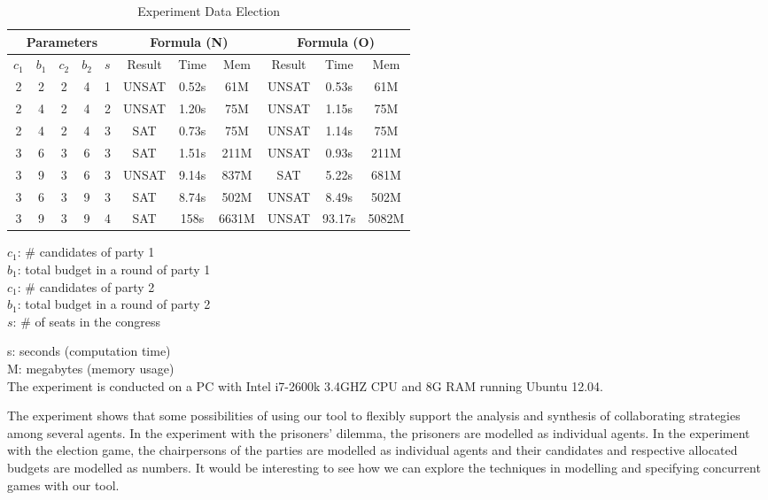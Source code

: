 \begin{table*}[!th]
\caption{Experiment Data Election}
\label{tab.exp.vote}
\begin{center}
\begin{tabular}{c|c|c|c|c||c|c|c||c|c|c} \hline
\multicolumn{5}{c||}{Parameters}
&\multicolumn{3}{c||}{Formula (N)} 
& \multicolumn{3}{c}{Formula (O)}\\ \hline
$c_1$ & $b_1$ & $c_2$ & $b_2$ & $s$ & Result & Time & Mem & Result & Time & Mem\\ \hline
2&2 &2 &4 &1 &UNSAT &0.52s &61M  &UNSAT &0.53s &61M \\
2&4 &2 &4 &2 &UNSAT &1.20s &75M  &UNSAT &1.15s &75M \\
2&4 &2 &4 &3 &SAT   &0.73s &75M  &UNSAT &1.14s &75M \\
3&6 &3 &6 &3 &SAT   &1.51s &211M &UNSAT &0.93s &211M \\
3&9 &3 &6 &3 &UNSAT &9.14s &837M &SAT   &5.22s &681M \\
3&6 &3 &9 &3 &SAT   &8.74s &502M &UNSAT &8.49s &502M \\
3&9 &3 &9 &4 &SAT   &158s  &6631M&UNSAT &93.17s&5082M \\ \hline
\end{tabular}
\hspace*{2mm}
\parbox{75mm}{
$c_1$: \# candidates of party 1\\
$b_1$: total budget in a round of party 1\\
$c_1$: \# candidates of party 2\\
$b_1$: total budget in a round of party 2\\
$s$: \# of seats in the congress\\
}
\parbox{75mm}{
s: seconds (computation time)\\
M: megabytes (memory usage) \\[2mm]
The experiment is conducted on a PC with Intel i7-2600k 3.4GHZ CPU 
and 8G RAM running Ubuntu 12.04. 
}
\end{center}
\end{table*}

The experiment shows that some possibilities of using our tool to flexibly support the analysis and synthesis of collaborating strategies among several agents. 
In the experiment with the prisoners' dilemma, the prisoners are modelled as individual agents.  
In the experiment with the election game, the chairpersons of the parties are modelled as individual agents and their candidates and respective allocated budgets are modelled as numbers.  
It would be interesting to see how we can explore the techniques in modelling and specifying concurrent games with our tool.



